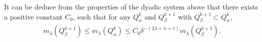 \documentclass[12pt]{amsart}
\begin{document}


It can be deduce from the properties of the dyadic system above that there exists a positive constant
$C_{0}$, such that for any $Q^k_{\alpha}$ and $Q^{k+1}_{\beta}$  with $Q^{k+1}_{\beta}\subset Q^k_{\alpha}$,
\begin{align}\label{Cmu0}
m_\lambda(Q^{k+1}_{\beta})\leq m_\lambda(Q^k_{\alpha})\leq C_0\delta^{-(2\lambda+n+1)}m_\lambda(Q^{k+1}_{\beta}).
\end{align}
%
%
%
\end{document}
